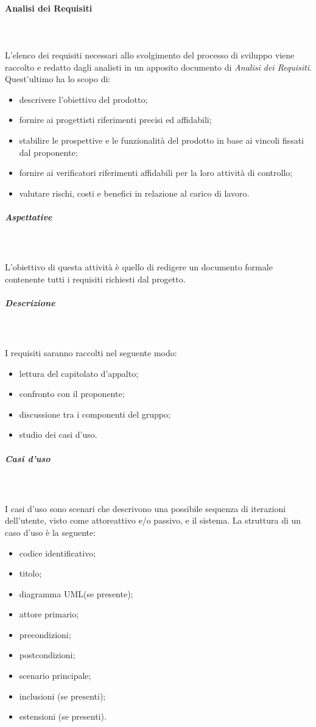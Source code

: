 			\paragraph{Analisi dei Requisiti} \mbox{} \\ \mbox{} \\
			L'elenco dei requisiti necessari allo svolgimento del processo di sviluppo viene raccolto e redatto dagli analisti in un apposito documento di \textit{Analisi dei Requisiti}. Quest'ultimo ha lo scopo di:
				\begin{itemize}
					\item descrivere l'obiettivo del prodotto;
					\item fornire ai progettisti riferimenti precisi ed affidabili;
					\item stabilire le prospettive e le funzionalità del prodotto in base ai vincoli fissati dal proponente;
					\item fornire ai verificatori riferimenti affidabili per la loro attività di controllo;
					\item valutare rischi, costi e benefici in relazione al carico di lavoro.
				\end{itemize} 
			\subparagraph*{Aspettative} \mbox{} \\ \mbox{} \\
			L'obiettivo di questa attività è quello di redigere un documento formale contenente tutti i requisiti richiesti dal progetto.
			\subparagraph*{Descrizione} \mbox{} \\ \mbox{} \\
			I requisiti saranno raccolti nel seguente modo:
				\begin{itemize} 
					\item lettura del capitolato d'appalto;
					\item confronto con il proponente;
					\item discussione tra i componenti del gruppo;
					\item studio dei casi d'uso.
				\end{itemize}
				\subparagraph*{Casi d'uso} \mbox{} \\ \mbox{} \\
				I casi d'uso sono scenari che descrivono una possibile sequenza di iterazioni dell'utente, visto come attore\glo attivo e/o passivo, e il sistema. La struttura di un caso d'uso è la seguente:
				\begin{itemize}
					\item codice identificativo;
					\item titolo;
					\item diagramma UML\glo (se presente);
					\item attore primario;
					\item precondizioni;
					\item postcondizioni;
					\item scenario principale;
					\item inclusioni (se presenti);
					\item estensioni (se presenti).

				\end{itemize}
